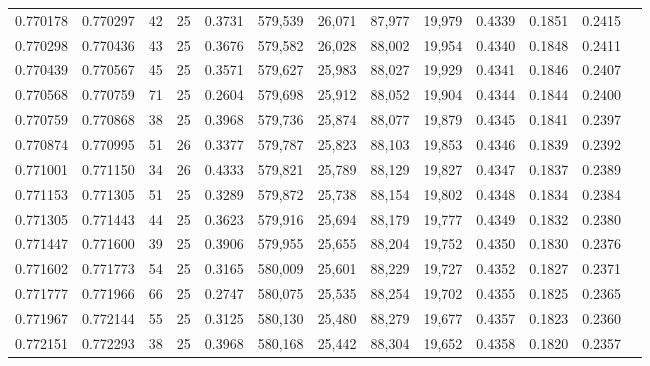 \begin{tabular}{rrrrrrrrrrrrr}
0.770178 & 0.770297 &    42 &  25 &                                     0.3731 & 579,539 &  26,071 &  87,977 &  19,979 & 0.4339 & 0.1851 & 0.2415 \\
0.770298 & 0.770436 &    43 &  25 &                                     0.3676 & 579,582 &  26,028 &  88,002 &  19,954 & 0.4340 & 0.1848 & 0.2411 \\
0.770439 & 0.770567 &    45 &  25 &                                     0.3571 & 579,627 &  25,983 &  88,027 &  19,929 & 0.4341 & 0.1846 & 0.2407 \\
0.770568 & 0.770759 &    71 &  25 &                                     0.2604 & 579,698 &  25,912 &  88,052 &  19,904 & 0.4344 & 0.1844 & 0.2400 \\
0.770759 & 0.770868 &    38 &  25 &                                     0.3968 & 579,736 &  25,874 &  88,077 &  19,879 & 0.4345 & 0.1841 & 0.2397 \\
0.770874 & 0.770995 &    51 &  26 &                                     0.3377 & 579,787 &  25,823 &  88,103 &  19,853 & 0.4346 & 0.1839 & 0.2392 \\
0.771001 & 0.771150 &    34 &  26 &                                     0.4333 & 579,821 &  25,789 &  88,129 &  19,827 & 0.4347 & 0.1837 & 0.2389 \\
0.771153 & 0.771305 &    51 &  25 &                                     0.3289 & 579,872 &  25,738 &  88,154 &  19,802 & 0.4348 & 0.1834 & 0.2384 \\
0.771305 & 0.771443 &    44 &  25 &                                     0.3623 & 579,916 &  25,694 &  88,179 &  19,777 & 0.4349 & 0.1832 & 0.2380 \\
0.771447 & 0.771600 &    39 &  25 &                                     0.3906 & 579,955 &  25,655 &  88,204 &  19,752 & 0.4350 & 0.1830 & 0.2376 \\
0.771602 & 0.771773 &    54 &  25 &                                     0.3165 & 580,009 &  25,601 &  88,229 &  19,727 & 0.4352 & 0.1827 & 0.2371 \\
0.771777 & 0.771966 &    66 &  25 &                                     0.2747 & 580,075 &  25,535 &  88,254 &  19,702 & 0.4355 & 0.1825 & 0.2365 \\
0.771967 & 0.772144 &    55 &  25 &                                     0.3125 & 580,130 &  25,480 &  88,279 &  19,677 & 0.4357 & 0.1823 & 0.2360 \\
0.772151 & 0.772293 &    38 &  25 &                                     0.3968 & 580,168 &  25,442 &  88,304 &  19,652 & 0.4358 & 0.1820 & 0.2357 \\

\end{tabular}
